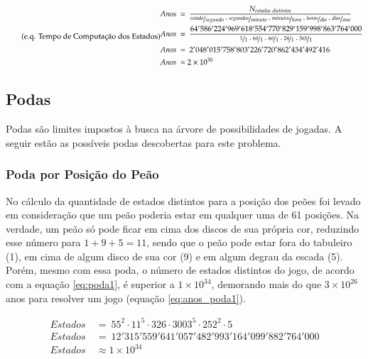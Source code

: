 \begin{equation} \label{eq:anos_estados} \tag{e.q. Tempo de Computação dos Estados}
\begin{split}
Anos\ &=\ \dfrac{N_{estados\ distintos}}{\nicefrac{estado}{segundo}\cdot\nicefrac{segundos}{minuto}\cdot\nicefrac{minutos}{hora}\cdot\nicefrac{horas}{dia}\cdot\nicefrac{dias}{ano}}\\
Anos\ &=\ \dfrac{64'586'224'969'618'554'770'829'159'998'863'764'000}{\nicefrac{1}{1}\cdot\nicefrac{60}{1}\cdot\nicefrac{60}{1}\cdot\nicefrac{24}{1}\cdot\nicefrac{365}{1}}\\
Anos\ &=\ 2'048'015'758'803'226'720'862'434'492'416\\
Anos\ &\approx 2\times10^{30}
\end{split}
\end{equation}

\subsection{Podas}

Podas são limites impostos à busca na árvore de possibilidades de jogadas. A seguir estão as possíveis podas descobertas para este problema.

\subsubsection{Poda por Posição do Peão}

No cálculo da quantidade de estados distintos para a posição dos peões foi levado em consideração que um peão poderia estar em qualquer uma de 61 posições. Na verdade, um peão só pode ficar em cima dos discos de sua própria cor, reduzindo esse número para $1+9+5=11$, sendo que o peão pode estar fora do tabuleiro (1), em cima de algum disco de sua cor (9) e em algum degrau da escada (5). Porém, mesmo com essa poda, o número de estados distintos do jogo, de acordo com a equação \ref{eq:poda1}, é superior a $1\times 10^{34}$, demorando mais do que $3\times10^{26}$ anos para resolver um jogo (equação \ref{eq:anos_poda1}).

\begin{equation} \label{eq:poda1} \tag{e.q. Poda por posição}
\begin{split}
	Estados\ &=\ 55^{2}\cdot11^{5}\cdot326\cdot3003^{5}\cdot252^{2}\cdot5\\
	Estados\ &=\ 12'315'559'641'057'482'993'164'099'882'764'000\\
	Estados\ &\approx 1\times 10^{34}
\end{split}
\end{equation}


